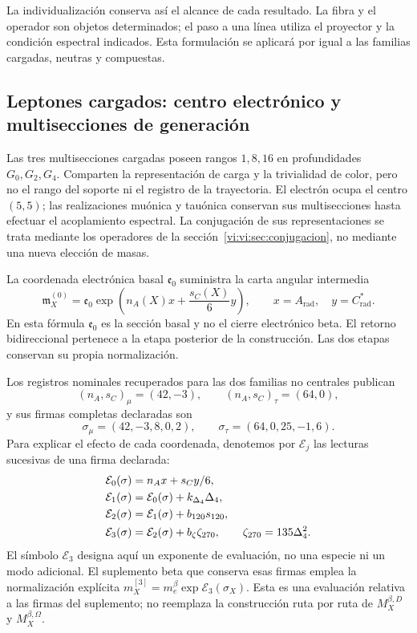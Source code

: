 La individualización conserva así el alcance de cada resultado. La fibra
y el operador son objetos determinados; el paso a una línea utiliza el
proyector y la condición espectral indicados. Esta formulación se aplicará
por igual a las familias cargadas, neutras y compuestas.

\subsection{Leptones cargados: centro electrónico y multisecciones de generación}
\label{vi:vi:subsec:leptones-cargados}

Las tres multisecciones cargadas poseen rangos \(1,8,16\) en profundidades
\(G_0,G_2,G_4\). Comparten la representación de carga y la trivialidad
de color, pero no el rango del soporte ni el registro de la trayectoria.
El electrón ocupa el centro \((5,5)\); las realizaciones muónica y
tauónica conservan sus multisecciones hasta efectuar el acoplamiento
espectral. La conjugación de sus representaciones se trata mediante los
operadores de la sección~\ref{vi:vi:sec:conjugacion}, no mediante una nueva
elección de masas.

La coordenada electrónica basal \(\mathfrak e_0\) suministra la carta
angular intermedia
\begin{equation}
 \mathfrak m_X^{(0)}=\mathfrak e_0
 \exp\left(n_A(X)x+\frac{s_C(X)}6y\right),
 \qquad x=A_{\mathrm{rad}},\quad y=C^*_{\mathrm{rad}}.
 \label{vi:vi:eq:carta-angular-familias}
\end{equation}
En esta fórmula \(\mathfrak e_0\) es la sección basal y no el cierre
electrónico beta. El retorno bidireccional pertenece a la etapa posterior
de la construcción. Las dos etapas conservan su propia normalización.

Los registros nominales recuperados para las dos familias no centrales
publican
\[
 (n_A,s_C)_\mu=(42,-3),\qquad (n_A,s_C)_\tau=(64,0),
\]
y sus firmas completas declaradas son
\begin{equation}
 \sigma_\mu=(42,-3,8,0,2),\qquad
 \sigma_\tau=(64,0,25,-1,6).
 \label{vi:vi:eq:firmas-muon-tau}
\end{equation}
Para explicar el efecto de cada coordenada, denotemos por \(\mathcal E_j\)
las lecturas sucesivas de una firma declarada:
\begin{align}
 \mathcal E_0(\sigma)&=n_Ax+s_Cy/6,\notag\\
 \mathcal E_1(\sigma)&=\mathcal E_0(\sigma)+k_{\Delta_4}\Delta_4,\notag\\
 \mathcal E_2(\sigma)&=\mathcal E_1(\sigma)+b_{120}s_{120},\notag\\
 \mathcal E_3(\sigma)&=\mathcal E_2(\sigma)+b_\zeta\zeta_{270},
 \qquad\zeta_{270}=135\Delta_4^2.
 \label{vi:vi:eq:etapas-e3-sectoriales}
\end{align}
El símbolo \(\mathcal E_3\) designa aquí un exponente de evaluación,
no una especie ni un modo adicional. El suplemento beta que conserva esas
firmas emplea la normalización explícita
\(m_X^{[3]}=m_e^\beta\exp\mathcal E_3(\sigma_X)\).
Esta es una evaluación relativa a las firmas del suplemento; no reemplaza
la construcción ruta por ruta de \(M_X^{\beta,D}\) y
\(M_X^{\beta,\Omega}\).

